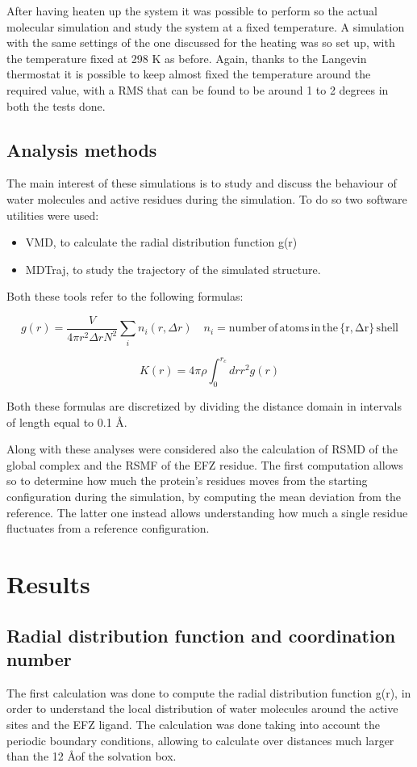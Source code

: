\documentclass[12pt]{article}
\begin{document}
After having heaten up the system it was possible to perform so the actual molecular simulation and study the system at a fixed temperature. A simulation with the same settings of the one discussed for the heating was so set up, with the temperature fixed at 298 K as before.
Again, thanks to the Langevin thermostat it is possible to keep almost fixed the temperature around the required value, with a RMS that can be found to be around 1 to 2 degrees in both the tests done.

\subsection{Analysis methods}
The main interest of these simulations is to study and discuss the behaviour of water molecules and active residues during the simulation. To do so two software utilities were used:
\begin{itemize}
    \item VMD\cite{VMD}, to calculate the radial distribution function g(r)
    \item MDTraj\cite{MDTraj}, to study the trajectory of the simulated structure.
\end{itemize}

Both these tools refer to the following formulas:

$$g(r) = \frac{V}{4\pi r^2 \Delta r N^2}\sum_i n_i(r,\Delta r) \quad n_i = \mathrm{number \, of \, atoms \, in \, the \, \{r,\Delta r\} \, shell}$$
 
$$K(r) = 4\pi \rho \int_{0}^{r_c} dr r^2 g(r)$$

Both these formulas are discretized by dividing the distance domain in intervals of length equal to 0.1 \AA.

Along with these analyses were considered also the calculation of RSMD of the global complex and the RSMF of the EFZ residue. The first computation allows so to determine how much the protein's residues moves from the starting configuration during the simulation, by computing the mean deviation from the reference. The latter one instead allows understanding how much a single residue fluctuates from a reference configuration.
\section{Results}

\subsection{Radial distribution function and coordination number}
The first calculation was done to compute the radial distribution function g(r), in order to understand the local distribution of water molecules around the active sites and the EFZ ligand. The calculation was done taking into account the periodic boundary conditions, allowing to calculate over distances much larger than the 12 \AA of the solvation box.
\end{document}
